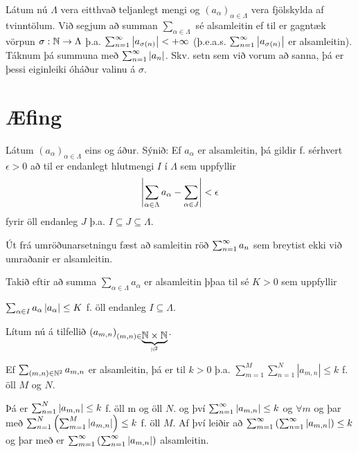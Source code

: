 \documentclass[12pt]{book}
\begin{document}
Látum nú $\Lambda$ vera eitthvað teljanlegt mengi og $(a_{\alpha})_{\alpha \in \Lambda}$ vera fjölskylda af tvinntölum. Við segjum að summan $\sum_{\alpha \in \Lambda}$ sé alsamleitin ef
til er gagntæk vörpun $\sigma: \mathbb{N} \to \Lambda$ þ.a. $\sum_{n = 1}^{\infty} \left|a_{\sigma(n)}\right| < +\infty$ (þ.e.a.s. $\sum_{n = 1}^{\infty} \left|a_{\sigma(n)}\right|$ er alsamleitin). Táknum þá summuna með $\sum_{n = 1}^{\infty} \left|a_n\right|$. Skv. setn sem við vorum að sanna, þá er þessi eiginleiki óháður valinu á $\sigma$.


\section*{Æfing}

Látum $(a_{\alpha})_{\alpha \in \Lambda}$ eins og áður. Sýnið: Ef $a_{\alpha}$ er alsamleitin, þá gildir f. sérhvert $\epsilon > 0$ að til er endanlegt hlutmengi $I$ í $\Lambda$ sem uppfyllir
\[ \left|\sum_{\alpha \in \Lambda} a_{\alpha} - \sum_{\alpha \in J} \right| < \epsilon \]
fyrir öll endanleg $J$ þ.a. $I \subseteq J \subseteq \Lambda $. 

\begin{ath} Út frá umröðunarsetningu fæst að samleitin röð $\sum_{n = 1}^{\infty} a_n$ sem breytist ekki við umraðanir er alsamleitin. 

{ 
    \def\aal{a_{\alpha}}
    \def\aall{(\aal)_{\alpha \in \Lambda}}
    \def\saal{\sum_{\alpha \in \Lambda} a_{\alpha}} 

\newcommand{\sal}[1]{\sum_{\alpha \in #1} a_{\alpha } }

Takið eftir að summa 
$\saal$ er alsamleitin þþaa til sé $ K > 0$ sem uppfyllir

$\sal{I} \abs{\aal} \leq K$ f. öll endanleg $I \subseteq \Lambda$.

\def\mn{(m,n)}
\def\amn{a_{m,n}}
Lítum nú á tilfellið $(\amn)_{\mn \in \underbrace{\N \times \N}_{\N^2}}$.

Ef $\sum_{\mn \in \N^2} \amn$ er alsamleitin, þá er til $k > 0$ þ.a.
$\sum_{m=1}^M \sum_{n=1}^N | \amn| \leq k$ f. öll $M$ og $N$.

Þá er $\sum_{n=1}^N \abs{\amn} \leq k$ f. öll m og öll $N$. og því
$\sumoinfty \abs{\amn} \leq k$ og $\forall m$ og þar með $\sum_{n=1}^N \left(\sum_{m=1}^M \abs{\amn}\right) \leq k$ f. öll $M$. Af því leiðir að $\sum_{m=1}^{\infty} \left( \sumoinfty \abs{\amn} \right) \leq k$ og þar með er $\sum_{m=1}^{\infty} \left( \sumoinfty \abs{\amn} \right)$ alsamleitin.
}

\end{ath}
\end{document}
